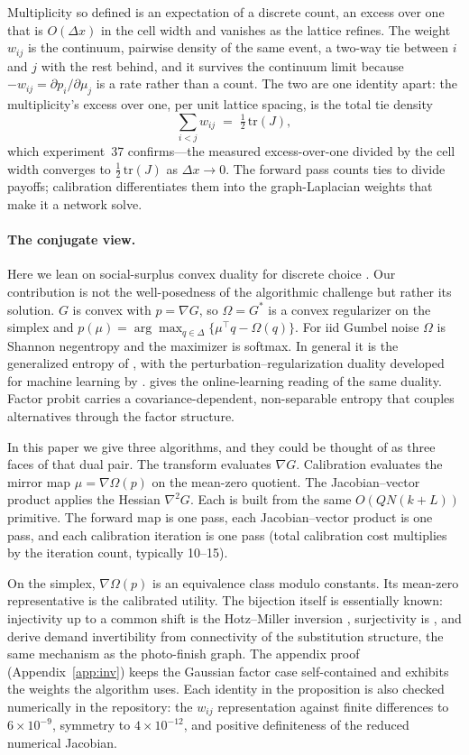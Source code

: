 \documentclass[12pt]{article}
\theoremstyle{remark}
\begin{document}
Multiplicity so defined is an expectation of a discrete count, an
excess over one that is $O(\Delta x)$ in the cell width and vanishes as
the lattice refines. The weight $w_{ij}$ is the continuum, pairwise
density of the same event, a two-way tie between $i$ and $j$ with the
rest behind, and it survives the continuum limit because
$-w_{ij} = \partial p_i/\partial\mu_j$ is a rate rather than a count. The
two are one identity apart: the multiplicity's excess over one, per unit
lattice spacing, is the total tie density
\[
\sum_{i<j} w_{ij} \;=\; \tfrac12\,\mathrm{tr}(J),
\]
which experiment~37 confirms---the measured excess-over-one divided by
the cell width converges to $\tfrac12\,\mathrm{tr}(J)$ as
$\Delta x \to 0$. The forward pass counts ties to divide payoffs;
calibration differentiates them into the graph-Laplacian weights that
make it a network solve.

\paragraph{The conjugate view.} Here we lean on social-surplus convex
duality for discrete choice \citep{chiong2016,norets2013}. Our
contribution is not the well-posedness of the algorithmic challenge but
rather its solution. $G$ is
convex with $p = \nabla G$, so $\Omega = G^*$ is a convex regularizer on
the simplex and $p(\mu) = \arg\max_{q \in \Delta}\{\mu^\top q -
\Omega(q)\}$. For iid Gumbel noise $\Omega$ is Shannon negentropy and
the maximizer is softmax. In general it is the generalized entropy of
\citet{fosgerau2020}, with the perturbation--regularization duality
developed for machine learning by \citet{berthet2020}.
\citet{melo2025} gives the online-learning reading of the same
duality. Factor probit
carries a covariance-dependent, non-separable entropy that couples
alternatives through the factor structure. 

In this paper we give three
algorithms, and they could be thought of as three faces of that dual
pair. The transform evaluates $\nabla G$. Calibration evaluates the
mirror map $\mu = \nabla\Omega(p)$ on the mean-zero quotient. The
Jacobian--vector product applies the Hessian $\nabla^2 G$. Each is
built from the same $O(QN(k+L))$ primitive. The forward map is one
pass, each Jacobian--vector product is one pass, and each calibration
iteration is one pass (total calibration cost multiplies by the
iteration count, typically 10--15). 

On the simplex, $\nabla\Omega(p)$ is an equivalence
class modulo constants. Its mean-zero representative is the calibrated
utility. The bijection itself is essentially known:
injectivity up to a common shift is the Hotz--Miller inversion
\citep{hotz1993}, surjectivity is \citet{norets2013}, and
\citet{bgh2013} derive demand invertibility from
connectivity of the substitution structure, the same mechanism as the
photo-finish graph. The appendix proof (Appendix~\ref{app:inv}) keeps the
Gaussian factor case self-contained and exhibits the weights the algorithm uses. Each
identity in the proposition is also checked
numerically in the repository: the $w_{ij}$ representation against finite
differences to $6\times10^{-9}$, symmetry to $4\times10^{-12}$, and
positive definiteness of the reduced numerical Jacobian.
\end{document}
